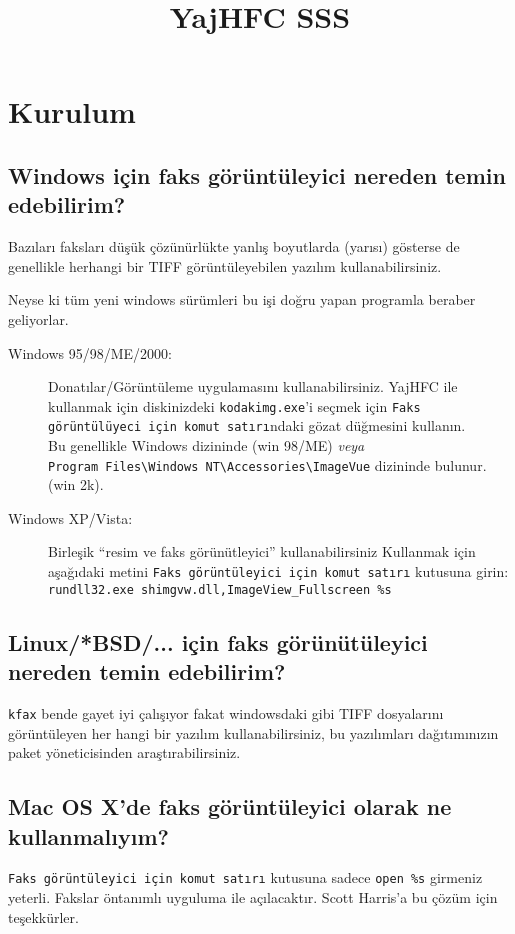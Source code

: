 \documentclass[a4paper,10pt]{scrartcl}
\title{YajHFC SSS}
\author{}
\date{}
\begin{document}
\sloppy
\maketitle

\tableofcontents

\section{Kurulum}
\subsection{Windows için faks görüntüleyici nereden temin edebilirim?}

Bazıları faksları düşük çözünürlükte yanlış boyutlarda (yarısı) gösterse de 
genellikle herhangi bir TIFF görüntüleyebilen yazılım kullanabilirsiniz.

Neyse ki tüm yeni windows sürümleri bu işi doğru yapan programla beraber geliyorlar.

\begin{description}
\item[Windows 95/98/ME/2000:]
Donatılar/Görüntüleme uygulamasını kullanabilirsiniz.
	YajHFC ile kullanmak için diskinizdeki \texttt{kodakimg.exe}'i seçmek için 
	\texttt{Faks görüntülüyeci için komut satırı}ndaki gözat düğmesini kullanın.\\
	Bu genellikle Windows dizininde (win 98/ME) \emph{veya} \\
\verb.Program Files\Windows NT\Accessories\ImageVue. dizininde bulunur. (win 2k). 
       
\item[Windows XP/Vista:]
Birleşik ``resim ve faks görünütleyici'' kullanabilirsiniz
	Kullanmak için aşağıdaki metini \texttt{Faks görüntüleyici için komut satırı} kutusuna girin:\\
	\verb#rundll32.exe shimgvw.dll,ImageView_Fullscreen %s#
 \end{description}

      
\subsection{Linux/*BSD/... için faks görünütüleyici nereden temin edebilirim?}
\texttt{kfax} bende gayet iyi çalışıyor fakat windowsdaki gibi TIFF dosyalarını görüntüleyen
her hangi bir yazılım kullanabilirsiniz, bu yazılımları dağıtımınızın paket yöneticisinden araştırabilirsiniz.


\subsection{Mac OS X'de faks görüntüleyici olarak ne kullanmalıyım?}
\texttt{Faks görüntüleyici için komut satırı} kutusuna sadece \verb.open %s. girmeniz yeterli.
Fakslar öntanımlı uyguluma ile açılacaktır.
Scott Harris'a bu çözüm için teşekkürler.
\end{document}

